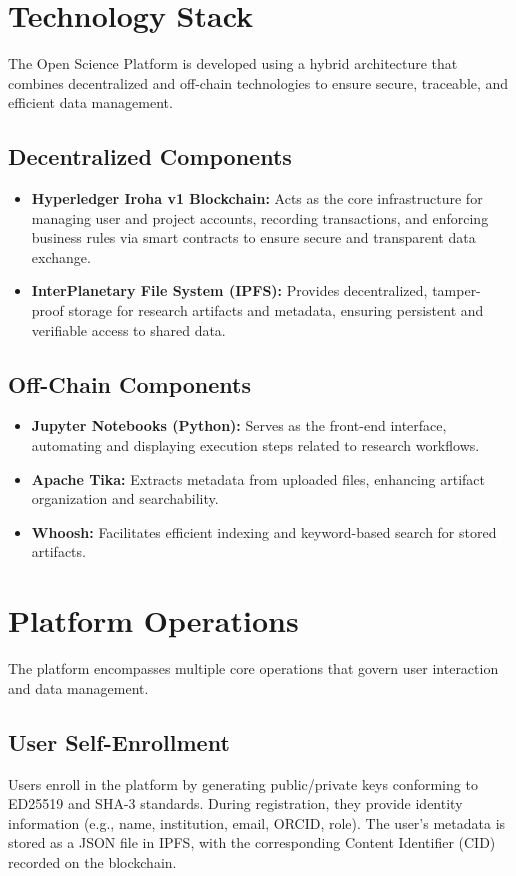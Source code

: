 \documentclass{article}
\begin{document}
\section{Technology Stack}
The Open Science Platform is developed using a hybrid architecture that combines decentralized and off-chain technologies to ensure secure, traceable, and efficient data management.

\subsection{Decentralized Components}
\begin{itemize}
      \item \textbf{Hyperledger Iroha v1 Blockchain:} Acts as the core infrastructure for managing user and project accounts, recording transactions, and enforcing business rules via smart contracts to ensure secure and transparent data exchange.
      \item \textbf{InterPlanetary File System (IPFS):} Provides decentralized, tamper-proof storage for research artifacts and metadata, ensuring persistent and verifiable access to shared data.
\end{itemize}

\subsection{Off-Chain Components}
\begin{itemize}
      \item \textbf{Jupyter Notebooks (Python):} Serves as the front-end interface, automating and displaying execution steps related to research workflows.
      \item \textbf{Apache Tika:} Extracts metadata from uploaded files, enhancing artifact organization and searchability.
      \item \textbf{Whoosh:} Facilitates efficient indexing and keyword-based search for stored artifacts.
\end{itemize}

\section{Platform Operations}
The platform encompasses multiple core operations that govern user interaction and data management.

\subsection{User Self-Enrollment}
Users enroll in the platform by generating public/private keys conforming to ED25519 and SHA-3 standards. During registration, they provide identity information (e.g., name, institution, email, ORCID, role). The user's metadata is stored as a JSON file in IPFS, with the corresponding Content Identifier (CID) recorded on the blockchain.
\end{document}
